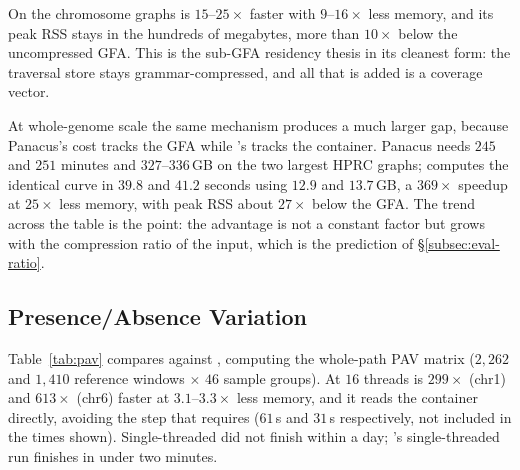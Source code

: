 On the chromosome graphs \sys is $15$--$25\times$ faster with $9$--$16\times$ less
memory, and its peak RSS stays in the hundreds of megabytes, more than $10\times$
below the uncompressed GFA. This is the sub-GFA residency thesis in its cleanest
form: the traversal store stays grammar-compressed, and all that is added is a
coverage vector.

At whole-genome scale the same mechanism produces a much larger gap, because
Panacus's cost tracks the GFA while \sys's tracks the container. Panacus needs
$245$ and $251$ minutes and $327$--$336$\,GB on the two largest HPRC graphs; \sys
computes the identical curve in $39.8$ and $41.2$ seconds using $12.9$ and
$13.7$\,GB, a $369\times$ speedup at $25\times$ less memory, with peak RSS about
$27\times$ below the GFA. The trend across the table is the point: the advantage
is not a constant factor but grows with the compression ratio of the input, which
is the prediction of \S\ref{subsec:eval-ratio}.

\subsection{Presence/Absence Variation}
\label{subsec:eval-pav}

Table~\ref{tab:pav} compares  against , computing the
whole-path PAV matrix ($2{,}262$ and $1{,}410$ reference windows $\times$ $46$
sample groups). At $16$ threads \sys is $299\times$ (chr1) and $613\times$ (chr6)
faster at $3.1$--$3.3\times$ less memory, and it reads the container directly,
avoiding the  step that  requires ($61$\,s and
$31$\,s respectively, not included in the times shown). Single-threaded
 did not finish within a day; \sys's single-threaded run finishes in
under two minutes.

